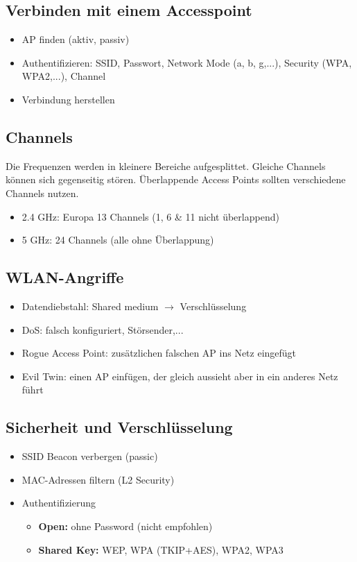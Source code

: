 \subsection*{Verbinden mit einem Accesspoint}
\begin{itemize}
	\item AP finden (aktiv, passiv)
	\item Authentifizieren: SSID, Passwort, Network Mode (a, b, g,...), Security (WPA, WPA2,...), Channel\\
	\item Verbindung herstellen
\end{itemize}

\subsection*{Channels}
Die Frequenzen werden in kleinere Bereiche aufgesplittet. Gleiche Channels können sich gegenseitig stören. Überlappende Access Points sollten verschiedene Channels nutzen.
\begin{itemize}
	\item 2.4 GHz: Europa 13 Channels (1, 6 \& 11 nicht überlappend)
	\item 5 GHz: 24 Channels (alle ohne Überlappung)
\end{itemize}

\subsection*{WLAN-Angriffe}
\begin{itemize}
	\item Datendiebstahl: Shared medium $\rightarrow$ Verschlüsselung
	\item DoS: falsch konfiguriert, Störsender,...
	\item Rogue Access Point: zusätzlichen falschen AP ins Netz eingefügt
	\item Evil Twin: einen AP einfügen, der gleich aussieht aber in ein anderes Netz führt
\end{itemize}

\subsection*{Sicherheit und Verschlüsselung}
\begin{itemize}
	\item SSID Beacon verbergen (passic)
	\item MAC-Adressen filtern (L2 Security)
	\item Authentifizierung
	\begin{itemize}
		\item \textbf{Open:} ohne Password (nicht empfohlen)
		\item \textbf{Shared Key:} WEP, WPA (TKIP+AES), WPA2, WPA3
	\end{itemize}
\end{itemize}

